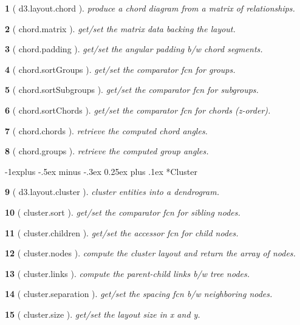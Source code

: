 \documentclass[10pt,landscape,letterpaper]{article}
\makeatletter
\newcounter{thm}
\newcommand{\hdrule}{\vspace{-4pt} \hdashrule[0.25ex]{\fill}{.5pt}{1pt}\vspace{-4pt}}
\theoremstyle{mytheoremstyle}
\newtheorem*{thm}{}
\renewcommand{\subsection}{\@startsection{subsection}{2}{0mm}%
                                {-1explus -.5ex minus -.3ex}%
                                {0.25ex plus .1ex}%
                                {\normalfont\normalsize\bfseries}}
\makeatother
\begin{document}
\begin{multicols}{3}
\begin{thm} [ d3.layout.chord ]  produce a chord diagram from a matrix of relationships.
\end{thm}\begin{thm} [ chord.matrix ]  get/set the matrix data backing the layout.
\end{thm}\begin{thm} [ chord.padding ]  get/set the angular padding b/w chord segments.
\end{thm}\begin{thm} [ chord.sortGroups ]  get/set the comparator fcn for groups.
\end{thm}\begin{thm} [ chord.sortSubgroups ]  get/set the comparator fcn for subgroups.
\end{thm}\begin{thm} [ chord.sortChords ]  get/set the comparator fcn for chords (z-order).
\end{thm}\begin{thm} [ chord.chords ]  retrieve the computed chord angles.
\end{thm}\begin{thm} [ chord.groups ]  retrieve the computed group angles.\end{thm}
\hdrule
\subsection*{Cluster}

\begin{thm} [ d3.layout.cluster ]  cluster entities into a dendrogram.
\end{thm}\begin{thm} [ cluster.sort ]  get/set the comparator fcn for sibling nodes.
\end{thm}\begin{thm} [ cluster.children ]  get/set the accessor fcn for child nodes.
\end{thm}\begin{thm} [ cluster.nodes ]  compute the cluster layout and return the array of nodes.
\end{thm}\begin{thm} [ cluster.links ]  compute the parent-child links b/w tree nodes.
\end{thm}\begin{thm} [ cluster.separation ]  get/set the spacing fcn b/w neighboring nodes.
\end{thm}\begin{thm} [ cluster.size ]  get/set the layout size in x and y.\end{thm}
\hdrule

\end{multicols}
\end{document}
